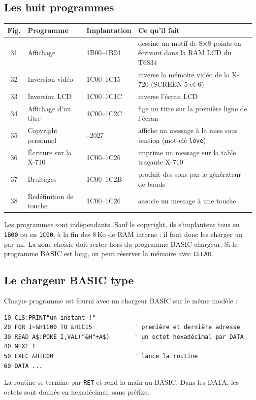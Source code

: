 \documentclass[a4paper,10pt]{article}
\newcommand{\hex}[1]{\texttt{#1}}
\begin{document}
\subsection{Les huit programmes}
\begin{center}\small
\begin{tabular}{@{}cl>{\ttfamily}l>{\raggedright\arraybackslash}p{6.6cm}@{}}
\toprule
Fig. & Programme & \normalfont Implantation & Ce qu'il fait \\
\midrule
31 & Affichage & 1B00--1B24 & dessine un motif de 8$\times$8 points en écrivant dans la RAM LCD du T6834 \\
32 & Inversion vidéo & 1C00--1C15 & inverse la mémoire vidéo de la X-720 (SCREEN 5 et 6) \\
33 & Inversion LCD & 1C00--1C1C & inverse l'écran LCD \\
34 & Affichage d'un titre & 1C00--1C2C & fige un titre sur la première ligne de l'écran \\
35 & Copyright personnel & 2000--2027 & affiche un message à la mise sous tension (mot-clé \texttt{love}) \\
36 & Écriture sur la X-710 & 1C00--1C26 & imprime un message sur la table traçante X-710 \\
37 & Bruitages & 1C00--1C2B & produit des sons par le générateur de bauds \\
38 & Redéfinition de touche & 1C00--1C20 & associe un message à une touche \\
\bottomrule
\end{tabular}
\end{center}

Les programmes sont indépendants. Sauf le copyright, ils s'implantent tous en
\hex{1B00} ou en \hex{1C00}, à la fin des 8\,Ko de RAM interne : il faut
donc les charger un par un. La zone choisie doit rester hors du programme
BASIC chargeur. Si le programme BASIC est long, on peut réserver la mémoire
avec \texttt{CLEAR}.

\subsection{Le chargeur BASIC type}
Chaque programme est fourni avec un chargeur BASIC sur le même modèle :
\begin{verbatim}
10 CLS:PRINT"un instant !"
20 FOR I=&H1C00 TO &H1C15            ' première et dernière adresse
30 READ A$:POKE I,VAL("&H"+A$)       ' un octet hexadécimal par DATA
40 NEXT I
50 EXEC &H1C00                       ' lance la routine
60 DATA ...
\end{verbatim}
La routine se termine par \texttt{RET} et rend la main au BASIC. Dans les
DATA, les octets sont donnés en hexadécimal, sans préfixe.
\end{document}
